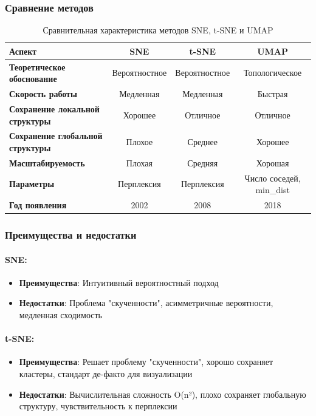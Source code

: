 \documentclass[a4paper,12pt]{article}
\begin{document}
\subsubsection{Сравнение методов}

\begin{table}[h]
\centering
\begin{tabular}{|l|c|c|c|}
\hline
\textbf{Аспект} & \textbf{SNE} & \textbf{t-SNE} & \textbf{UMAP} \\ \hline
\textbf{Теоретическое обоснование} & Вероятностное & Вероятностное & Топологическое \\ \hline
\textbf{Скорость работы} & Медленная & Медленная & Быстрая \\ \hline
\textbf{Сохранение локальной структуры} & Хорошее & Отличное & Отличное \\ \hline
\textbf{Сохранение глобальной структуры} & Плохое & Среднее & Хорошее \\ \hline
\textbf{Масштабируемость} & Плохая & Средняя & Хорошая \\ \hline
\textbf{Параметры} & Перплексия & Перплексия & Число соседей, min\_dist \\ \hline
\textbf{Год появления} & 2002 & 2008 & 2018 \\ \hline
\end{tabular}
\caption{Сравнительная характеристика методов SNE, t-SNE и UMAP}
\end{table}

\subsubsection{Преимущества и недостатки}

\paragraph{SNE:}
\begin{itemize}
    \item \textbf{Преимущества}: Интуитивный вероятностный подход
    \item \textbf{Недостатки}: Проблема "скученности", асимметричные вероятности, медленная сходимость
\end{itemize}

\paragraph{t-SNE:}
\begin{itemize}
    \item \textbf{Преимущества}: Решает проблему "скученности", хорошо сохраняет кластеры, стандарт де-факто для визуализации
    \item \textbf{Недостатки}: Вычислительная сложность O(n²), плохо сохраняет глобальную структуру, чувствительность к перплексии
\end{itemize}
\end{document}
